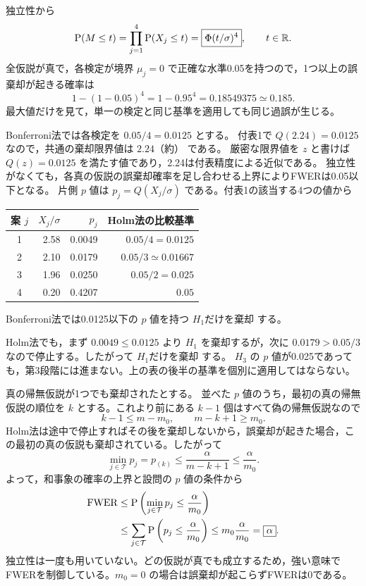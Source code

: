 \documentclass[a4paper,11pt]{ltjsarticle}
\begin{document}
独立性から
\[
\operatorname{P}(M\leq t)=\prod_{j=1}^4\operatorname{P}(X_j\leq t)
=\boxed{\Phi(t/\sigma)^4},\qquad t\in\mathbb R.
\]
全仮説が真で，各検定が境界 $\mu_j=0$ で正確な水準0.05を持つので，1つ以上の誤棄却が起きる確率は
\[
\boxed{1-(1-0.05)^4=1-0.95^4=0.18549375\simeq0.185}.
\]
最大値だけを見て，単一の検定と同じ基準を適用しても同じ過誤が生じる。

Bonferroni法では各検定を $0.05/4=0.0125$ とする。
付表1で $Q(2.24)=0.0125$ なので，共通の棄却限界値は $\boxed{2.24\text{（約）}}$ である。
厳密な限界値を $z$ と書けば $Q(z)=0.0125$ を満たす値であり，2.24は付表精度による近似である。
独立性がなくても，各真の仮説の誤棄却確率を足し合わせる上界によりFWERは0.05以下となる。
\newpage
{}
片側 $p$ 値は $p_j=Q(X_j/\sigma)$ である。付表1の該当する4つの値から
\begin{center}
\begin{tabular}{crrr}
\toprule
案 $j$ & $X_j/\sigma$ & $p_j$ & Holm法の比較基準\\
\midrule
1 & 2.58 & 0.0049 & $0.05/4=0.0125$\\
2 & 2.10 & 0.0179 & $0.05/3\simeq0.01667$\\
3 & 1.96 & 0.0250 & $0.05/2=0.025$\\
4 & 0.20 & 0.4207 & $0.05$\\
\bottomrule
\end{tabular}
\end{center}
Bonferroni法では0.0125以下の $p$ 値を持つ $\boxed{H_1\text{だけを棄却}}$ する。

Holm法でも，まず $0.0049\leq0.0125$ より $H_1$ を棄却するが，次に
$0.0179>0.05/3$ なので停止する。したがって $\boxed{H_1\text{だけを棄却}}$ する。
$H_3$ の $p$ 値が0.025であっても，第3段階には進まない。上の表の後半の基準を個別に適用してはならない。

真の帰無仮説が1つでも棄却されたとする。
並べた $p$ 値のうち，最初の真の帰無仮説の順位を $k$ とする。これより前にある $k-1$ 個はすべて偽の帰無仮説なので
\[
k-1\leq m-m_0,\qquad m-k+1\geq m_0.
\]
Holm法は途中で停止すればその後を棄却しないから，誤棄却が起きた場合，この最初の真の仮説も棄却されている。したがって
\[
\min_{j\in\mathcal T}p_j=p_{(k)}\leq\frac\alpha{m-k+1}\leq\frac\alpha{m_0}.
\]
よって，和事象の確率の上界と設問の $p$ 値の条件から
\begin{align*}
\operatorname{FWER}
&\leq\operatorname{P}\left(\min_{j\in\mathcal T}p_j\leq\frac\alpha{m_0}\right)\\
&\leq\sum_{j\in\mathcal T}\operatorname{P}\left(p_j\leq\frac\alpha{m_0}\right)
\leq m_0\frac\alpha{m_0}=\boxed\alpha.
\end{align*}
独立性は一度も用いていない。どの仮説が真でも成立するため，強い意味でFWERを制御している。$m_0=0$ の場合は誤棄却が起こらずFWERは0である。
\end{document}
